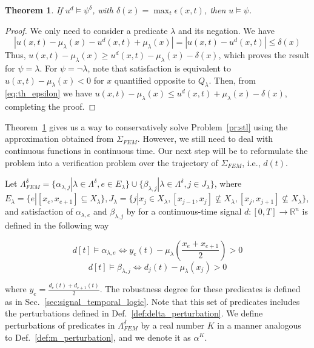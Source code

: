 \documentclass{article}
\newtheorem{theorem}{Theorem}
\newcommand*{\R}{\mathbb{R}}
\begin{document}
\begin{theorem}
\label{th:epsilon_approximation}
    If $u^d \models \psi^{\delta}$, with $\delta(x) = \max_t \epsilon(x, t)$, then $u \models \psi$.
\end{theorem}
\begin{proof}
    We only need to consider a predicate $\lambda$ and its negation. We have
    \begin{equation}
        \label{eq:th_epsilon}
         |u(x, t) - \mu_\lambda(x) - u^d(x, t) + \mu_\lambda(x)| = 
         |u(x, t) - u^d(x, t)| \leq \delta(x)
    \end{equation}
    Thus, $u(x, t) - \mu_\lambda(x) \geq u^d(x, t) -
    \mu_\lambda(x) - \delta(x)$, which proves the result for $\psi = \lambda$. For $\psi
    = \lnot \lambda$, note that satisfaction is equivalent to $u(x, t) -
    \mu_\lambda(x) < 0$ for $x$ quantified opposite to $Q_\lambda$. Then, from
    \eqref{eq:th_epsilon} we have $u(x, t) - \mu_\lambda(x) \leq u^d(x, t) +
    \mu_\lambda(x) - \delta(x)$, completing the proof.
\end{proof}

Theorem~\ref{th:epsilon_approximation} gives us a way to conservatively solve
Problem~\ref{pr:stl} using the approximation obtained from $\Sigma_{FEM}$.
However, we still need to deal with continuous functions in continuous time. Our
next step will be to reformulate the problem into a verification problem over
the trajectory of $\Sigma_{FEM}$, i.e., $d(t)$.

Let $\Lambda^{\delta}_{FEM} = \{\alpha_{\lambda, j} | \lambda \in
\Lambda^{\delta}, e \in E_{\lambda}\} \cup \{\beta_{\lambda, j} | \lambda \in
\Lambda^{\delta}, j \in J_{\lambda}\}$, where $E_{\lambda} = \{e | [x_e, x_{e+1}] \subseteq
X_{\lambda}\}, J_{\lambda} = \{j | x_j \in X_\lambda, [x_{j-1}, x_j] \not\subseteq
X_\lambda, [x_{j}, x_{j+1}] \not\subseteq X_\lambda \}$,
and satisfaction of $\alpha_{\lambda, e}$ and $\beta_{\lambda, j}$ by 
for a continuous-time signal $d : [0, T] \to \R^n$
is defined in the following way  

\begin{equation}
    d[t] \models \alpha_{\lambda, e} \iff y_e(t) - 
    \mu_\lambda(\frac{x_e + x_{e + 1}}{2}) > 0 
\end{equation}
\begin{equation}
     d[t] \models \beta_{\lambda, j} \iff d_j(t) - \mu_\lambda(x_j) > 0
\end{equation}

where $y_e = \frac{d_e(t) + d_{e+1}(t)}{2}$. The robustness degree for these
predicates is defined as in Sec.~\ref{sec:signal_temporal_logic}.
Note that this set of predicates includes the perturbations defined in
Def.~\ref{def:delta_perturbation}. We define perturbations of predicates in
$\Lambda^{\delta}_{FEM}$ by a real number $K$ in a manner analogous to
Def.~\ref{def:m_perturbation}, and we denote it as $\alpha^K$.
\end{document}
